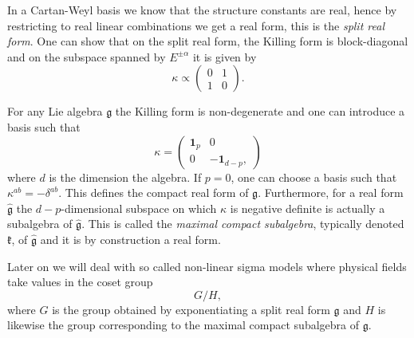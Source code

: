 In a Cartan-Weyl basis we know that the structure constants are real, hence by restricting to real linear combinations we get a real form, this is the \emph{split real form}. One can show that on the split real form, the Killing form is block-diagonal and on the subspace spanned by $E^{\pm\alpha}$ it is given by 
\begin{equation}
    \kappa \propto \begin{pmatrix} 0&1\\1&0\end{pmatrix}.
\end{equation}

For any Lie algebra $\mathfrak{g}$ the Killing form is non-degenerate and one can introduce a basis such that 
\begin{equation}
    \kappa = \begin{pmatrix}\mathbf{1}_p& 0\\0&-\mathbf{1}_{d-p},
    \end{pmatrix}
\end{equation}
where $d$ is the dimension the algebra. If $p=0$, one can choose a basis such that $\kappa^{ab} = -\delta^{ab}$. This defines the compact real form of $\mathfrak{g}$. Furthermore, for a real form $\hat{\mathfrak{g}}$ the $d-p$-dimensional subspace on which $\kappa$ is negative definite is actually a subalgebra of $\hat{\mathfrak{g}}$. This is called the \emph{maximal compact subalgebra}, typically denoted $\mathfrak{k}$, of $\hat{\mathfrak{g}}$ and it is by construction a real form.

Later on we will deal with so called non-linear sigma models where physical fields take values in the coset group
\begin{equation}
G/H,
\end{equation}
where $G$ is the group obtained by exponentiating a split real form $\mathfrak{g}$ and $H$ is likewise the group corresponding to the maximal compact subalgebra of $\mathfrak{g}$.  

